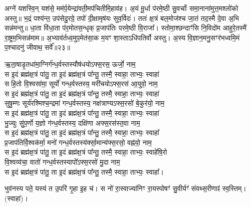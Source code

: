 अग्ने॑ यशस्वि॒न् यश॑से॒ मम॑र्प॒येन्द्रा॑वती॒मप॑चितीमि॒हाव॑ह।
अ॒यं मू॒र्धा प॑रमे॒ष्ठी सु॒वर्चाः᳚ समा॒नाना॑मुत्त॒मश्लो॑को अस्तु॥
भ॒द्रं पश्य॑न्त॒ उप॑सेदु॒रग्रे॒ तपो॑ दी॒क्षामृष॑यः सुव॒र्विदः॑।
ततः॑ क्ष॒त्रं बल॒मोज॑श्च जा॒तं तद॒स्मै दे॒वा अ॒भि सन्न॑मन्तु॥
धा॒ता वि॑धा॒ता प॑र॒मोतस॒न्धृक् प्र॒जाप॑तिः परमे॒ष्ठी वि॒राजा᳚।
स्तोमा॒श्छन्दाꣳ॑सि नि॒विदो॑म आहुरे॒तस्मै॑ रा॒ष्ट्रम॒भिसन्न॑माम॥
अ॒भ्याव॑र्तध्व॒मुप॒मेत॑सा॒क म॒यꣳ शा॒स्ताऽधि॑पतिर्वो अस्तु।
अ॒स्य वि॒ज्ञान॒मनु॒सꣳर॑भध्वमि॒मं प॒श्चादनु॑ जीवाथ॒ सर्वे᳚॥२३॥


ऋ॒ता॒षाडृ॒तधा॑मा॒ग्निर्ग॑न्ध॒र्वस्तस्यौष॑धयोऽफ्स॒रस॒ ऊर्जो॒ नाम॒\\
स इ॒दं ब्रह्म॑क्ष॒त्रं पा॑तु॒ ता इ॒दं ब्रह्म॑क्ष॒त्रं पा᳚न्तु॒ तस्मै॒ स्वाहा॒ ताभ्यः॒ स्वाहा॑\\
सहि॒तो वि॒श्वसा॑मा॒ सूर्यो॑ गन्ध॒र्वस्तस्य॒ मरी॑चयोऽफ्स॒रस॑ आ॒युवो॒ नाम॒\\
स इ॒दं ब्रह्म॑क्ष॒त्रं पा॑तु॒ ता इ॒दं ब्रह्म॑क्ष॒त्रं पा᳚न्तु॒ तस्मै॒ स्वाहा॒ ताभ्यः॒ स्वाहा॑\\
सुषु॒म्णः सूर्य॑रश्मिश्च॒न्द्रमा॑ गन्ध॒र्वस्तस्य॒ नक्ष॑त्राण्यऽफ्स॒रसो॑ बे॒कुर॑यो॒ नाम॒\\
स इ॒दं ब्रह्म॑क्ष॒त्रं पा॑तु॒ ता इ॒दं ब्रह्म॑क्ष॒त्रं पा᳚न्तु॒ तस्मै॒ स्वाहा॒ ताभ्यः॒ स्वाहा॑\\
भु॒ज्युः सुु॑प॒र्णो य॒ज्ञो ग॑न्ध॒र्वस्तस्य॒ दक्षि॑णा अफ्स॒रस॑स्त॒वा नाम॒\\
स इ॒दं ब्रह्म॑क्ष॒त्रं पा॑तु॒ ता इ॒दं ब्रह्म॑क्ष॒त्रं पा᳚न्तु॒ तस्मै॒ स्वाहा॒ ताभ्यः॒ स्वाहा᳚\\
प्र॒जाप॑तिर्वि॒श्वक॑र्मा॒ मनो॑ गन्ध॒र्वस्तस्य॑र्क्सा॒मान्य॑फ्स॒रसो॒ वह्न॑यो॒  नाम॒\\
स इ॒दं ब्रह्म॑क्ष॒त्रं पा॑तु॒ ता इ॒दं ब्रह्म॑क्ष॒त्रं पा᳚न्तु॒ तस्मै॒ स्वाहा॒ ताभ्यः॒ स्वाहे॑षि॒रो\\
वि॒श्वव्य॑चा॒ वातो॑ गन्ध॒र्वस्तस्यापो᳚ऽफ्स॒रसो॑ मु॒दा नाम॒\\
स इ॒दं ब्रह्म॑क्ष॒त्रं पा॑तु॒ ता इ॒दं ब्रह्म॑क्ष॒त्रं पा᳚न्तु॒ तस्मै॒ स्वाहा॒ ताभ्यः॒ स्वाहा᳚।

भुव॑नस्य पते॒ यस्य॑ त उ॒परि॑ गृ॒हा इ॒ह च॑।
स नो॑ रा॒स्वाज्या॑निꣳ रा॒यस्पोषꣳ॑ सु॒वीर्यꣳ॑ संवथ्स॒रीणाꣴ॑ स्व॒स्तिम्। (स्वाहा॑)।

